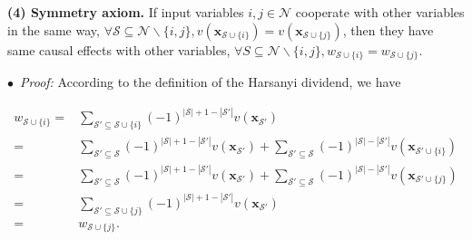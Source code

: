 \textbf{(4) Symmetry axiom.} If input variables {\small $i,j\in \mathcal{N}$} cooperate with other variables in the same way, {\small $\forall \mathcal{S}\subseteq \mathcal{N}\backslash\{i,j\}, v(\boldsymbol{x}_{\mathcal{S}\cup\{i\}})=v(\boldsymbol{x}_{\mathcal{S}\cup\{j\}})$}, then they have same causal effects with other variables, {\small $\forall S\subseteq \mathcal{N}\backslash\{i,j\}, w_{\mathcal{S}\cup\{i\}}=w_{\mathcal{S}\cup\{j\}}$}.

$\bullet$~\textit{Proof:} According to the definition of the Harsanyi dividend, we have

\begin{small}
\begin{align*}
w_{\mathcal{S}\cup\{i\}} =& \sum_{\mathcal{S}'\subseteq \mathcal{S}\cup\{i\}} (-1)^{|\mathcal{S}|+1-|\mathcal{S}'|}v(\boldsymbol{x}_{\mathcal{S}'})\\
=& \sum_{\mathcal{S}'\subseteq \mathcal{S}} (-1)^{|\mathcal{S}|+1-|\mathcal{S}'|}v(\boldsymbol{x}_{\mathcal{S}'}) + \sum_{\mathcal{S}'\subseteq \mathcal{S}} (-1)^{|\mathcal{S}|-|\mathcal{S}'|}v(\boldsymbol{x}_{\mathcal{S}'\cup\{i\}})\\
=& \sum_{\mathcal{S}'\subseteq \mathcal{S}} (-1)^{|\mathcal{S}|+1-|\mathcal{S}'|}v(\boldsymbol{x}_{\mathcal{S}'}) + \sum_{\mathcal{S}'\subseteq \mathcal{S}} (-1)^{|\mathcal{S}|-|\mathcal{S}'|}v(\boldsymbol{x}_{\mathcal{S}'\cup\{j\}})\\
=& \sum_{\mathcal{S}'\subseteq \mathcal{S}\cup\{j\}} (-1)^{|\mathcal{S}|+1-|\mathcal{S}'|}v(\boldsymbol{x}_{\mathcal{S}'})\\
=& w_{\mathcal{S}\cup\{j\}}.
\end{align*}
\end{small}

